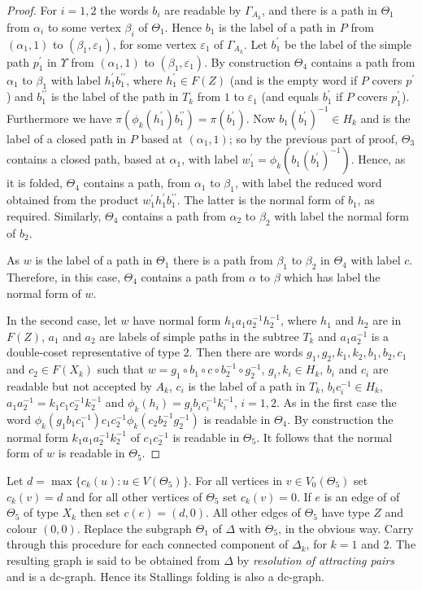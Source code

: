 \documentclass[a4paper,12pt]{article}
\renewcommand{\a}{\alpha }
\renewcommand{\b}{\beta }
\newcommand{\G}{\Gamma }
\newcommand{\D}{\Delta }
\newcommand{\e}{\varepsilon }
\newcommand{\T}{\Theta }
\newcommand{\U}{\Upsilon }
\numberwithin{equation}{section}
\numberwithin{figure}{section}
\begin{document}
\begin{proof}
For $i=1,2$ the words $b_i$ are readable by $\G_{A_k}$, and there
is a path in $\T_1$ from $\a_i$ to some vertex $\b_i$ of $\T_1$.
Hence $b_1$ is the label of a path in $P$ from $(\a_1,1)$ to
$(\b_1,\e_1)$, for some vertex $\e_1$ of $\G_{A_k}$.   Let $b_1^\prime$
 be the label of the simple path $p_1^\prime$ in $\U$ from 
$(\a_1,1)$ to $(\b_1,\e_1)$. By construction $\T_4$ contains a path
from $\a_1$ to $\b_1$ with label $h_1^\prime b_1^{\prime\prime}$, where
$h_1^\prime \in F(Z)$ (and is the empty word if $P$ covers $p^\prime$) and 
$b_1^{\prime\prime}$ is the label of the path in $T_k$ from $1$ to 
$\e_1$ (and equals $b_1^\prime$ if $P$ covers $p_1^\prime$).  
Furthermore we have 
$\pi(\phi_k(h_1^\prime)b_1^{\prime\prime})=\pi(b_1^\prime)$. 
Now $b_1(b_1^\prime)^{-1}\in H_k$ and is the label of a closed
path  in $P$ based at $(\a_1,1)$; so by the 
previous part of proof, $\T_3$ contains a closed path, based at $\a_1$, 
 with label 
$w_1^\prime=\phi_k(b_1(b_1^\prime)^{-1})$. Hence, as it is folded, 
$\T_4$ contains a path, from $\a_1$ to $\b_1$, 
with label the reduced word obtained from the product 
$w_1^{\prime} h_1^\prime b_1^{\prime\prime}$. The latter is the normal 
form of $b_1$, as required. Similarly, $\T_4$ contains a path from 
$\a_2$ to $\b_2$ with label the normal form of $b_2$. 

As $w$ is the label of a path in $\T_1$ there is a path from $\b_1$ to
$\b_2$ in $\T_4$ with label $c$. Therefore, in this case, $\T_4$ contains
a path from $\a$ to $\b$ which has label the normal form of $w$. 

In the second case, 
let $w$ have normal form $h_1 a_1 a_2^{-1} h_2^{-1} $, where 
$h_1$ and $h_2$ are in $F(Z)$,  $a_1$ and $a_2$ are labels 
of simple paths in the subtree $T_k$ and $a_1a_2^{-1}$ is a double-coset
representative of type $2$. Then there are words
$g_1, g_2, k_1, k_2, b_1, b_2, c_1$ and $c_2\in F(X_k)$ such that 
$w=g_1\circ b_1\circ c \circ b_2^{-1}\circ g_2^{-1}$, 
$g_i, k_i\in H_k$, $b_i$ and $c_i$ are 
readable but not accepted by  $A_k$, $c_i$ is the label of 
a path in $T_k$, $b_ic_i^{-1}\in H_k$, $a_1a_2^{-1}=k_1c_1c_2^{-1}k_2^{-1}$
 and  
$\phi_k(h_i)=g_ib_ic_i^{-1}k_i^{-1}$, $i=1,2$. 
As in the first case the word $\phi_k(g_1b_1c_1^{-1})c_1 c_2^{-1}
\phi_k(c_2b_2^{-1}g_2^{-1})$ is readable in $\T_4$. By construction the
normal form $k_1a_1a_2^{-1}k_2^{-1}$ of $c_1 c_2^{-1}$ is readable in
$\T_5$. It follows that the normal form of $w$ is readable in $\T_5$. 
\end{proof}

Let $d=\max\{c_k(u): u\in V(\T_5)\}$.  For all vertices
in $v\in V_0(\T_5)$ set $c_k(v)=d$ and for all other vertices
of $\T_5$ set $c_k(v)=0$. If $e$ is an edge of  of $\T_5$  of 
  type $X_k$ then set $c(e)=(d,0)$.  All other edges of $\T_5$ have
type $Z$ and colour $(0,0)$.
Replace
the subgraph $\T_1$ of $\D$ with $\T_5$, in the obvious
way. Carry through this procedure for each  connected component 
of $\D_k$, for $k=1$ and $2$. The resulting graph is said to
be obtained from $\D$ by {\em resolution of attracting pairs} and 
is  a dc-graph. Hence its Stallings folding is also a dc-graph.
\end{document}
